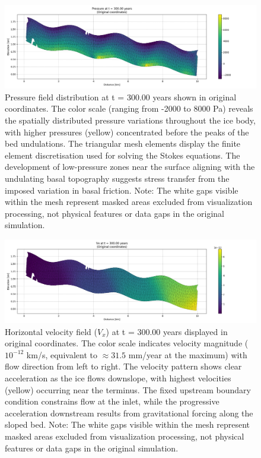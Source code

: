 \begin{figure}
    \includegraphics[scale=0.45]{Pressure_300yrs_xz.png}
    \caption{Pressure field distribution at t = 300.00 years shown in original coordinates. The color scale (ranging from -2000 to 8000 Pa) reveals the spatially distributed pressure variations throughout the ice body, with higher pressures (yellow) concentrated before the peaks of the bed undulations. The triangular mesh elements display the finite element discretisation used for solving the Stokes equations. The development of low-pressure zones near the surface aligning with the undulating basal topography suggests stress transfer from the imposed variation in basal friction. Note: The white gaps visible within the mesh represent masked areas excluded from visualization processing, not physical features or data gaps in the original simulation.}
    \label{fig:P}
\end{figure}

\begin{figure}
    \includegraphics[scale=0.45]{Vx_300yrs_xz.png}
    \caption{Horizontal velocity field ($V_x$) at t = 300.00 years displayed in original coordinates. The color scale indicates velocity magnitude ($10^{-12}$ km/s, equivalent to $\approx 31.5$ mm/year at the maximum) with flow direction from left to right. The velocity pattern shows clear acceleration as the ice flows downslope, with highest velocities (yellow) occurring near the terminus. The fixed upstream boundary condition  constrains flow at the inlet, while the progressive acceleration downstream results from gravitational forcing along the sloped bed. Note: The white gaps visible within the mesh represent masked areas excluded from visualization processing, not physical features or data gaps in the original simulation.}
    \label{fig:Vx}
\end{figure}

